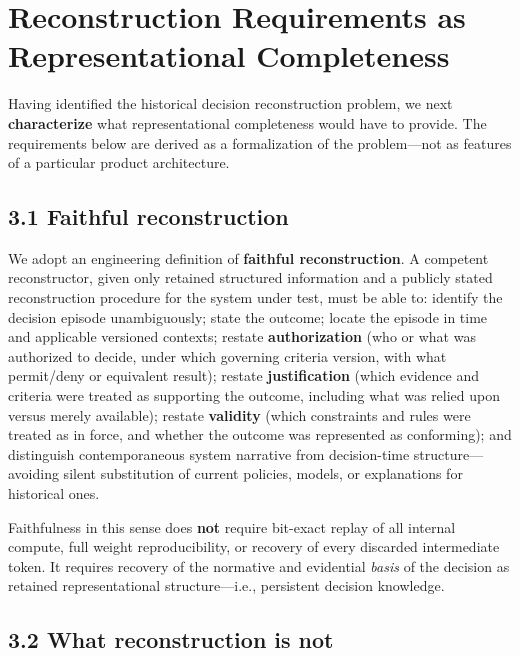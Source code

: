 \documentclass[11pt,a4paper]{article}
\begin{document}
\section{Reconstruction Requirements as Representational Completeness}

Having identified the historical decision reconstruction problem, we next \textbf{characterize} what representational completeness would have to provide. The requirements below are derived as a formalization of the problem---not as features of a particular product architecture.


\subsection{3.1 Faithful reconstruction}

We adopt an engineering definition of \textbf{faithful reconstruction}. A competent reconstructor, given only retained structured information and a publicly stated reconstruction procedure for the system under test, must be able to: identify the decision episode unambiguously; state the outcome; locate the episode in time and applicable versioned contexts; restate \textbf{authorization} (who or what was authorized to decide, under which governing criteria version, with what permit/deny or equivalent result); restate \textbf{justification} (which evidence and criteria were treated as supporting the outcome, including what was relied upon versus merely available); restate \textbf{validity} (which constraints and rules were treated as in force, and whether the outcome was represented as conforming); and distinguish contemporaneous system narrative from decision-time structure---avoiding silent substitution of current policies, models, or explanations for historical ones.


Faithfulness in this sense does \textbf{not} require bit-exact replay of all internal compute, full weight reproducibility, or recovery of every discarded intermediate token. It requires recovery of the normative and evidential \emph{basis} of the decision as retained representational structure---i.e., persistent decision knowledge.


\subsection{3.2 What reconstruction is not}
\end{document}
